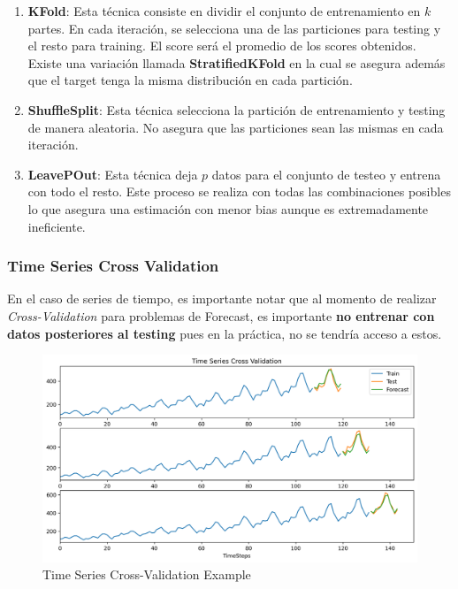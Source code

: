 \begin{enumerate}
    \item \textbf{KFold}: Esta técnica consiste en dividir el conjunto de entrenamiento en $k$ partes. En cada iteración, se selecciona una de las particiones para testing y el resto para training. El score será el promedio de los scores obtenidos. Existe una variación llamada \textbf{StratifiedKFold} en la cual se asegura además que el target tenga la misma distribución en cada partición.
    \item \textbf{ShuffleSplit}: Esta técnica selecciona la partición de entrenamiento y testing de manera aleatoria. No asegura que las particiones sean las mismas en cada iteración. 
    \item \textbf{LeavePOut}: Esta técnica deja $p$ datos para el conjunto de testeo y entrena con todo el resto. Este proceso se realiza con todas las combinaciones posibles lo que asegura una estimación con menor bias aunque es extremadamente ineficiente. 
\end{enumerate}

\subsubsection{Time Series Cross Validation}

En el caso de series de tiempo, es importante notar que al momento de realizar \textit{Cross-Validation} para problemas de Forecast, es importante \textbf{no entrenar con datos posteriores al testing} pues en la práctica, no se tendría acceso a estos.

\begin{figure}[H]
    \center
    \includegraphics[scale=0.45]{notebooks/Others/img/time_series_cross_validation.png}
    \caption{Time Series Cross-Validation Example}
\end{figure}








